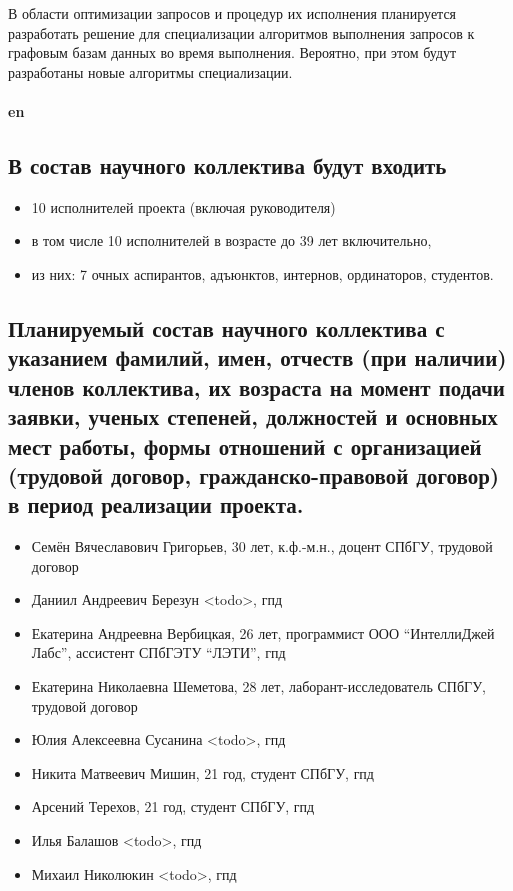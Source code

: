 \documentclass[12pt]{article}  %
\theoremstyle{remark}
\begin{document}
В области оптимизации запросов и процедур их исполнения планируется разработать решение для специализации алгоритмов выполнения запросов к графовым базам данных во время выполнения. 
Вероятно, при этом будут разработаны новые алгоритмы специализации.
\\
\\
\textbf{en}\\

\subsection{В состав научного коллектива будут входить}
%
\begin{itemize}
\item 10 исполнителей проекта (включая руководителя)
\item в том числе 10  исполнителей в возрасте до 39 лет включительно,
\item из них: 7 очных аспирантов, адъюнктов, интернов, ординаторов, студентов.
\end{itemize}

\subsection{Планируемый состав научного коллектива с указанием фамилий, имен, отчеств (при наличии) членов коллектива, их возраста на момент подачи заявки, ученых степеней, должностей и основных мест работы, формы отношений с организацией (трудовой договор, гражданско-правовой договор) в период реализации проекта.}

\begin{itemize}
  \item Семён Вячеславович Григорьев, 30 лет, к.ф.-м.н., доцент СПбГУ, трудовой договор
  \item Даниил Андреевич Березун {\huge<todo>}, гпд
  \item Екатерина Андреевна Вербицкая, 26 лет, программист ООО ``ИнтеллиДжей Лабс'', ассистент СПбГЭТУ ``ЛЭТИ'', гпд
  \item Екатерина Николаевна Шеметова, 28 лет, лаборант-исследователь СПбГУ, трудовой договор
  \item Юлия Алексеевна Сусанина {\huge<todo>}, гпд
  \item Никита Матвеевич Мишин, 21 год, студент СПбГУ, гпд
  \item Арсений Терехов, 21 год, студент СПбГУ, гпд
  \item Илья Балашов {\huge<todo>}, гпд
  \item Михаил Николюкин {\huge<todo>}, гпд
\end{itemize}
\end{document}

